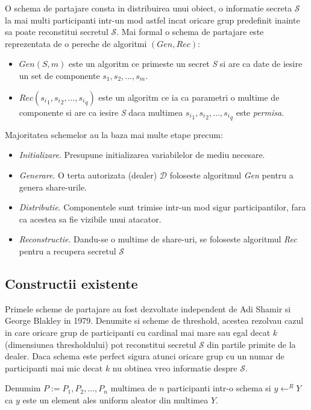\documentclass{llncs}
\begin{document}
O schema de partajare consta in distribuirea unui obiect, o informatie secreta $\mathcal{S}$ la mai multi participanti intr-un mod astfel incat oricare grup predefinit inainte sa poate reconstitui secretul $\mathcal{S}$.
Mai formal o schema de partajare este reprezentata de o pereche de algoritmi \textbf{$(Gen, Rec)$}:
\begin{itemize}
	\item \textit{$Gen(S, m)$} este un algoritm ce primeste un secret \textit{S} si are ca date de iesire un set de componente
	${s_1, s_2, \dots, s_m}$.
	\item \textit{$Rec({s_i}_1, {s_i}_2, \dots, {s_i}_q)$} este un algoritm ce ia ca parametri o multime de componente si are ca iesire
	\textit{S} daca multimea ${{s_i}_1, {s_i}_2, \dots, {s_i}_q}$ este \textit{permisa}. \cite{Olimid:2013}
\end{itemize} 
Majoritatea schemelor au la baza mai multe etape precum:
\begin{itemize}
	\item \textit{Initializare}. Presupune initializarea variabilelor de mediu necesare.
	\item \textit{Generare}. O terta autorizata (dealer) $\mathcal{D}$ foloseste algoritmul \textit{Gen} pentru a genera share-urile.
	\item \textit{Distributie}. Componentele sunt trimise intr-un mod sigur participantilor, fara ca acestea sa fie vizibile unui atacator.
	\item \textit{Reconstructie}. Dandu-se o multime de share-uri, se foloseste algoritmul \textit{Rec} pentru a recupera secretul $\mathcal{S}$
\end{itemize}


\subsection{Constructii existente}
Primele scheme de partajare au fost dezvoltate independent de Adi Shamir si George Blakley in 1979. \cite{B:1979, S:1979}
Denumite si scheme de threshold, acestea rezolvau cazul in care oricare grup de participanti cu cardinal mai mare sau egal decat $k$  (dimensiunea thresholdului) pot reconstitui secretul $\mathcal{S}$ din partile primite de la dealer. Daca schema este perfect sigura atunci oricare grup cu un numar de participanti mai mic decat $k$ nu obtinea vreo informatie despre $\mathcal{S}$.

Denumim $P := P_1, P_2, \dots, P_n$ multimea de $n$ participanti intr-o schema si $y \leftarrow^R Y$ ca $y$ este un element ales uniform aleator din multimea $Y$.
\end{document}
